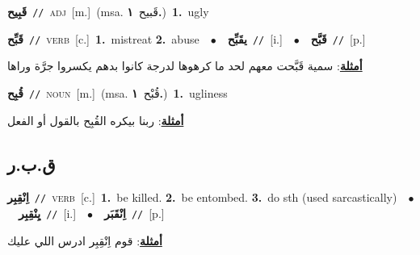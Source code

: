 \documentclass[10pt,a4paper,twoside]{article} %
\begin{document}
\begin{multicols}{2}
{{{\setlength\topsep{0pt}\textbf{\foreignlanguage{arabic}{قَبِيح}}\ {\color{gray}\texttt{//}\color{black}}\ \textsc{adj}\ [m.]\ \color{gray}(msa. \foreignlanguage{arabic}{قَبيح}~\foreignlanguage{arabic}{\textbf{١.}})\color{black}\ \textbf{1.}~ugly\ 

{\setlength\topsep{0pt}\textbf{\foreignlanguage{arabic}{قَبِّح}}\ {\color{gray}\texttt{//}\color{black}}\ \textsc{verb}\ [c.]\ \textbf{1.}~mistreat  \textbf{2.}~abuse\ \ $\bullet$\ \ \setlength\topsep{0pt}\textbf{\foreignlanguage{arabic}{يقَبِّح}}\ {\color{gray}\texttt{//}\color{black}}\ [i.]\ \ $\bullet$\ \ \setlength\topsep{0pt}\textbf{\foreignlanguage{arabic}{قَبَّح}}\ {\color{gray}\texttt{//}\color{black}}\ [p.]\  \begin{flushright}\color{gray}\foreignlanguage{arabic}{\textbf{\underline{\foreignlanguage{arabic}{أمثلة}}}: سمية قَبَّحت معهم لحد ما كرهوها لدرجة كانوا بدهم يكسروا جرَّة وراها}\end{flushright}\color{black}} \vspace{2mm}

{\setlength\topsep{0pt}\textbf{\foreignlanguage{arabic}{قُبِح}}\ {\color{gray}\texttt{//}\color{black}}\ \textsc{noun}\ [m.]\ \color{gray}(msa. \foreignlanguage{arabic}{قُبْح}~\foreignlanguage{arabic}{\textbf{١.}})\color{black}\ \textbf{1.}~ugliness\  \begin{flushright}\color{gray}\foreignlanguage{arabic}{\textbf{\underline{\foreignlanguage{arabic}{أمثلة}}}: ربنا بيكره القُبِح بالقول أو الفعل}\end{flushright}\color{black}} \vspace{2mm}

\vspace{-3mm}
\subsection*{\color{blue}\foreignlanguage{arabic}{ق.ب.ر}\color{blue}{}} 

{\setlength\topsep{0pt}\textbf{\foreignlanguage{arabic}{اِنْقِبِر}}\ {\color{gray}\texttt{//}\color{black}}\ \textsc{verb}\ [c.]\ \textbf{1.}~be killed.  \textbf{2.}~be entombed.  \textbf{3.}~do sth (used sarcastically)\ \ $\bullet$\ \ \setlength\topsep{0pt}\textbf{\foreignlanguage{arabic}{يِنْقِبِر}}\ {\color{gray}\texttt{//}\color{black}}\ [i.]\ \ $\bullet$\ \ \setlength\topsep{0pt}\textbf{\foreignlanguage{arabic}{اِنْقَبَر}}\ {\color{gray}\texttt{//}\color{black}}\ [p.]\  \begin{flushright}\color{gray}\foreignlanguage{arabic}{\textbf{\underline{\foreignlanguage{arabic}{أمثلة}}}: قوم اِنْقِبِر ادرس  اللي عليك}\end{flushright}\color{black}} \vspace{2mm}

}}}
\end{multicols}
\end{document}

